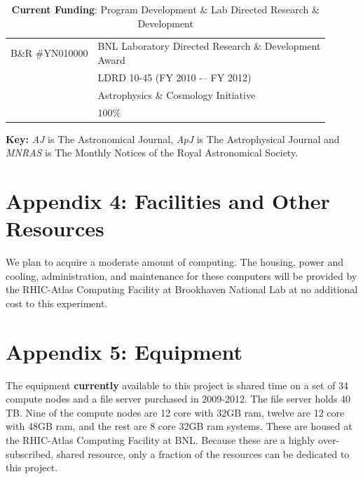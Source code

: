 \documentclass[12pt]{article}
\begin{document}
\begin{table}[h]
\begin{center}
\begin{tabular*}{0.85\textwidth}{ll}
B\&R \#YN010000  & \parbox[t]{\textwidth}{BNL Laboratory Directed 
   Research \& Development \\ Award} \\
                 & LDRD 10-45 (FY 2010 -– FY 2012) \\
                 & Astrophysics \& Cosmology Initiative \\
                 & 100\%
\end{tabular*}
\parbox{0.85\textwidth}{\caption{{\bf Current Funding}: Program Development 
\& Lab Directed Research \& Development \label{table:support}}}
\end{center}
\end{table}



\newpage
{}
\renewcommand{\refname}{\section*{Appendix 3: Bibliography for Narrative}\label{app:bib}}


\vspace{5mm}
\noindent
{\bf Key:} {\it AJ} is The Astronomical Journal, {\it ApJ} is The 
Astrophysical Journal and {\it MNRAS} is The Monthly Notices of the Royal
Astronomical Society.






\newpage
{}
\section*{Appendix 4: Facilities and Other Resources}

We plan to acquire a moderate amount of computing.  The housing, power and
cooling, administration, and maintenance for these computers will be provided
by the RHIC-Atlas Computing Facility at Brookhaven National Lab at no
additional cost to this experiment.		

\newpage
{}
\section*{Appendix 5: Equipment}

The equipment {\bf currently} available to this project is shared time on a set
of 34 compute nodes and a file server purchased in 2009-2012.  The file server
holds 40 TB. Nine of the compute nodes are 12 core with 32GB ram, twelve are 12
core with 48GB ram, and the rest are 8 core 32GB ram systems.  These are housed
at the RHIC-Atlas Computing Facility at BNL.  Because these are a highly
over-subscribed, shared resource, only a fraction of the resources can be
dedicated to this project.

\newpage
{}
\end{document}
